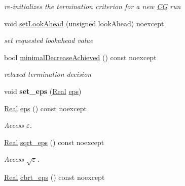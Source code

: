 \begin{DoxyCompactItemize}
\begin{DoxyCompactList}\small\item\em re-\/initializes the termination criterion for a new \hyperlink{namespaceSpacy_1_1CG}{\-C\-G} run \end{DoxyCompactList}\item 
void \hyperlink{classSpacy_1_1CG_1_1Termination_1_1StrakosTichyEnergyError_ac40343f544b7e2bfeffa7f7927cfeac5}{set\-Look\-Ahead} (unsigned look\-Ahead) noexcept
\begin{DoxyCompactList}\small\item\em set requested lookahead value \end{DoxyCompactList}\item 
bool \hyperlink{classSpacy_1_1CG_1_1Termination_1_1StrakosTichyEnergyError_af13fec942d9d9ec622803e226537ffec}{minimal\-Decrease\-Achieved} () const noexcept
\begin{DoxyCompactList}\small\item\em relaxed termination decision \end{DoxyCompactList}\item 
\hypertarget{classSpacy_1_1Mixin_1_1Eps_a818ab6dfab5e4eea583e1302bcc621f8}{void {\bfseries set\-\_\-eps} (\hyperlink{classSpacy_1_1Real}{\-Real} \hyperlink{classSpacy_1_1Mixin_1_1Eps_a812b99b0abc1d78a34b4114907f23f52}{eps})}\label{classSpacy_1_1Mixin_1_1Eps_a818ab6dfab5e4eea583e1302bcc621f8}

\item 
\hypertarget{classSpacy_1_1Mixin_1_1Eps_a812b99b0abc1d78a34b4114907f23f52}{\hyperlink{classSpacy_1_1Real}{\-Real} \hyperlink{classSpacy_1_1Mixin_1_1Eps_a812b99b0abc1d78a34b4114907f23f52}{eps} () const noexcept}\label{classSpacy_1_1Mixin_1_1Eps_a812b99b0abc1d78a34b4114907f23f52}

\begin{DoxyCompactList}\small\item\em \-Access $\varepsilon$. \end{DoxyCompactList}\item 
\hypertarget{classSpacy_1_1Mixin_1_1Eps_a1c1b0ed7f14ed4967dc7da9295a136d4}{\hyperlink{classSpacy_1_1Real}{\-Real} \hyperlink{classSpacy_1_1Mixin_1_1Eps_a1c1b0ed7f14ed4967dc7da9295a136d4}{sqrt\-\_\-eps} () const noexcept}\label{classSpacy_1_1Mixin_1_1Eps_a1c1b0ed7f14ed4967dc7da9295a136d4}

\begin{DoxyCompactList}\small\item\em \-Access $\sqrt\varepsilon$. \end{DoxyCompactList}\item 
\hypertarget{classSpacy_1_1Mixin_1_1Eps_a91dbe45e297be2bc53f1a96107a58c64}{\hyperlink{classSpacy_1_1Real}{\-Real} \hyperlink{classSpacy_1_1Mixin_1_1Eps_a91dbe45e297be2bc53f1a96107a58c64}{cbrt\-\_\-eps} () const noexcept}\label{classSpacy_1_1Mixin_1_1Eps_a91dbe45e297be2bc53f1a96107a58c64}


\end{DoxyCompactItemize}
